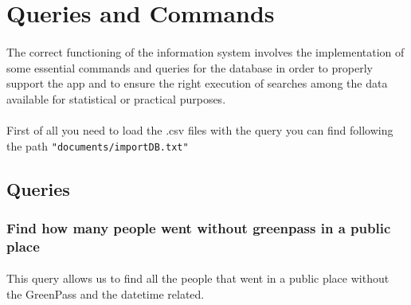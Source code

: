 \documentclass[a4paper,12pt]{article}
\begin{document}
\section{Queries and Commands}
\paragraph{} The correct functioning of the information system involves the implementation of some essential commands and queries for the database in order to properly support the app and to ensure the right execution of searches among the data available for statistical or practical purposes. \par
\paragraph{} First of all you need to load the .csv files with the query you can find following the path \texttt{"documents/importDB.txt"}
\subsection{Queries}
\subsubsection{Find how many people went without greenpass in a public place}
\paragraph{} This query allows us to find all the people that went in a public place without the GreenPass and the datetime related.
\begin{center}
\end{center}
\end{document}
